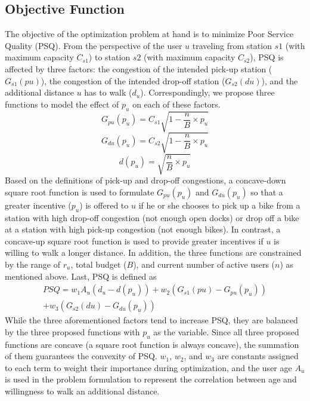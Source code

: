 \documentclass[times, 10pt,twocolumn]{article}
\begin{document}
\subsection{Objective Function}
 
The objective of the optimization problem at hand is to minimize Poor Service Quality (PSQ). From the perspective of the user $u$ traveling from station $s1$ (with maximum capacity $C_{s1}$) to station $s2$ (with maximum capacity $C_{s2}$), PSQ is affected by three factors: the congestion of the intended pick-up station ($G_{s1}(pu)$), the congestion of the intended drop-off station ($G_{s2}(du)$), and the additional distance $u$ has to walk ($d_u$). Correspondingly, we propose three functions to model the effect of $p_u$ on each of these factors.
\begin{equation}
G_{pu}(p_u) = C_{s1}\sqrt{1-\frac{n}{B} \times p_u}
\end{equation}
\begin{equation}
G_{du}(p_u) = C_{s2}\sqrt{1-\frac{n}{B} \times p_u}
\end{equation}
\begin{equation}
d(p_u) = \sqrt{\frac{n}{B} \times p_u}
\end{equation}
Based on the definitions of pick-up and drop-off congestions, a concave-down square root function is used to formulate $G_{pu}(p_u)$ and $G_{du}(p_u)$ so that a greater incentive ($p_u$) is offered to $u$ if he or she chooses to pick up a bike from a station with high drop-off congestion (not enough open docks) or drop off a bike at a station with high pick-up congestion (not enough bikes). In contrast, a concave-up square root function is used to provide greater incentives if $u$ is willing to walk a longer distance. In addition, the three functions are constrained by the range of $r_u$, total budget ($B$), and current number of active users ($n$) as mentioned above.
Last, PSQ is defined as
\begin{equation}
\begin{split}
PSQ = w_1A_u(d_u - d(p_u)) + w_2(G_{s1}(pu) - G_{pu}(p_u)) \\ + w_3(G_{s2}(du) - G_{du}(p_u))
\end{split}
\end{equation}
While the three aforementioned factors tend to increase PSQ, they are balanced by the three proposed functions with $p_u$ as the variable. Since all three proposed functions are concave (a square root function is always concave), the summation of them guarantees the convexity of PSQ. $w_1$, $w_2$, and $w_3$ are constants assigned to each term to weight their importance during optimization, and the user age $A_u$ is used in the problem formulation to represent the correlation between age and willingness to walk an additional distance. 
\end{document}
